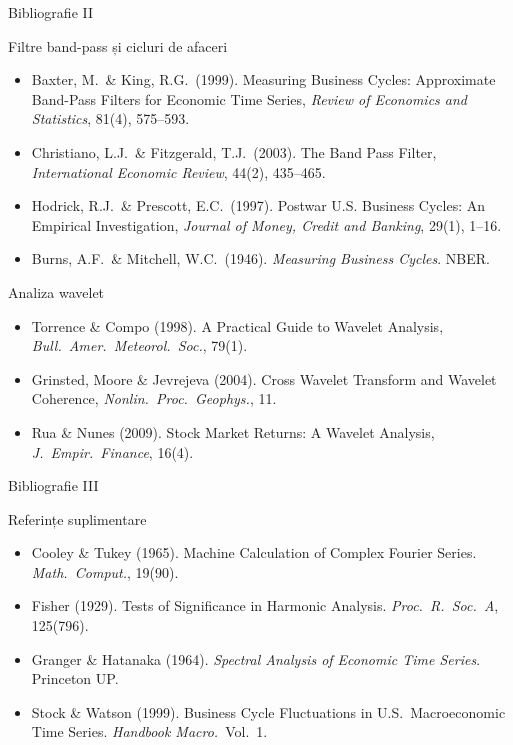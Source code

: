 \documentclass[9pt, aspectratio=169, t]{beamer}
\begin{document}
\begin{frame}{Bibliografie II}
    \begin{block}{Filtre band-pass și cicluri de afaceri}
        {\footnotesize
        \begin{itemize}\setlength{\itemsep}{0pt}
            \item Baxter, M.\ \& King, R.G.\ (1999). Measuring Business Cycles: Approximate Band-Pass Filters for Economic Time Series, \textit{Review of Economics and Statistics}, 81(4), 575--593.
            \item Christiano, L.J.\ \& Fitzgerald, T.J.\ (2003). The Band Pass Filter, \textit{International Economic Review}, 44(2), 435--465.
            \item Hodrick, R.J.\ \& Prescott, E.C.\ (1997). Postwar U.S. Business Cycles: An Empirical Investigation, \textit{Journal of Money, Credit and Banking}, 29(1), 1--16.
            \item Burns, A.F.\ \& Mitchell, W.C.\ (1946). \textit{Measuring Business Cycles}. NBER.
        \end{itemize}
        }
    \end{block}

    \vspace{-2mm}
    \begin{alertblock}{Analiza wavelet}
        {\scriptsize
        \begin{itemize}\setlength{\itemsep}{0pt}
            \item Torrence \& Compo (1998). A Practical Guide to Wavelet Analysis, \textit{Bull.\ Amer.\ Meteorol.\ Soc.}, 79(1).
            \item Grinsted, Moore \& Jevrejeva (2004). Cross Wavelet Transform and Wavelet Coherence, \textit{Nonlin.\ Proc.\ Geophys.}, 11.
            \item Rua \& Nunes (2009). Stock Market Returns: A Wavelet Analysis, \textit{J.\ Empir.\ Finance}, 16(4).
        \end{itemize}
        }
    \end{alertblock}
\end{frame}

\begin{frame}{Bibliografie III}
    \begin{block}{Referințe suplimentare}
        {\scriptsize
        \begin{itemize}\setlength{\itemsep}{-2pt}
            \item Cooley \& Tukey (1965). Machine Calculation of Complex Fourier Series. \textit{Math.\ Comput.}, 19(90).
            \item Fisher (1929). Tests of Significance in Harmonic Analysis. \textit{Proc.\ R.\ Soc.\ A}, 125(796).
            \item Granger \& Hatanaka (1964). \textit{Spectral Analysis of Economic Time Series}. Princeton UP.
            \item Stock \& Watson (1999). Business Cycle Fluctuations in U.S.\ Macroeconomic Time Series. \textit{Handbook Macro.}\ Vol.\ 1.
        \end{itemize}
        }
    \end{block}
\end{frame}
\end{document}
